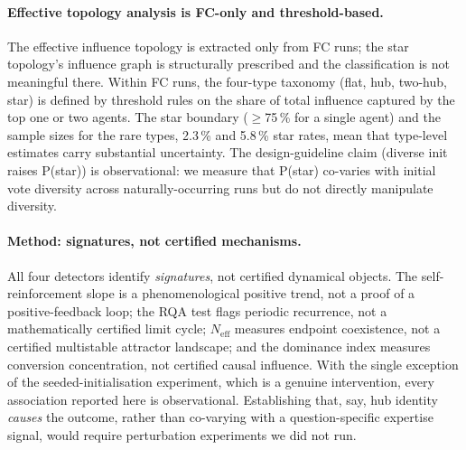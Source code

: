 \paragraph{Effective topology analysis is FC-only and threshold-based.}
The effective influence topology is extracted only from FC runs; the star topology's
influence graph is structurally prescribed and the classification is not
meaningful there.
Within FC runs, the four-type taxonomy (flat, hub, two-hub, star) is defined by
threshold rules on the share of total influence captured by the top one or two
agents.
The star boundary ($\geq$75\,\% for a single agent) and the sample sizes for the
rare types, 2.3\,\% and 5.8\,\% star rates, mean that type-level estimates carry
substantial uncertainty.
The design-guideline claim (diverse init raises P(star)) is observational: we
measure that P(star) co-varies with initial vote diversity across naturally-occurring
runs but do not directly manipulate diversity.

\paragraph{Method: signatures, not certified mechanisms.}
All four \suitename{} detectors identify \emph{signatures}, not certified dynamical
objects. The self-reinforcement slope is a phenomenological positive trend, not a
proof of a positive-feedback loop; the RQA test flags periodic recurrence, not a
mathematically certified limit cycle; $N_{\mathrm{eff}}$ measures endpoint
coexistence, not a certified multistable attractor landscape; and the dominance
index measures conversion concentration, not certified causal influence. With the
single exception of the seeded-initialisation experiment, which is a genuine
intervention, every association reported here is observational. Establishing that,
say, hub identity \emph{causes} the outcome, rather than co-varying with a
question-specific expertise signal, would require perturbation experiments we did
not run.

